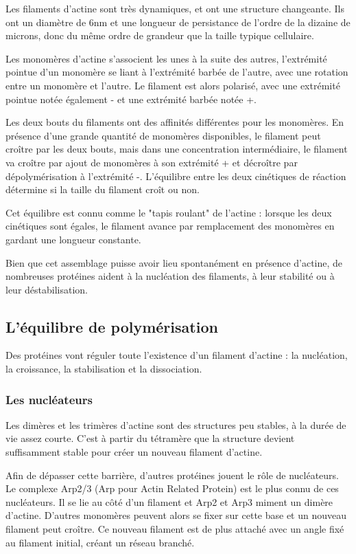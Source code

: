 Les filaments d'actine sont très dynamiques, et ont une structure changeante. Ils ont un diamètre de 6nm et une longueur de persistance de l'ordre de la dizaine de microns, donc du même ordre de grandeur que la taille typique cellulaire. 

Les monomères d'actine s'associent les unes à la suite des autres, l'extrémité pointue d'un monomère se liant à l'extrémité barbée de l'autre, avec une rotation entre un monomère et l'autre. 
Le filament est alors polarisé, avec une extrémité pointue notée également - et une extrémité barbée notée +. 

Les deux bouts du filaments ont des affinités différentes pour les monomères. En présence d'une grande quantité de monomères disponibles, le filament peut croître par les deux bouts, mais dans une concentration intermédiaire, le filament va croître par ajout de monomères à son extrémité + et décroître par dépolymérisation à l'extrémité -. L'équilibre entre les deux cinétiques de réaction détermine si la taille du filament croît ou non. 

Cet équilibre est connu comme le "tapis roulant" de l'actine : lorsque les deux cinétiques sont égales, le filament avance par remplacement des monomères en gardant une longueur constante. 

Bien que cet assemblage puisse avoir lieu spontanément en présence d'actine, de nombreuses protéines aident à la nucléation des filaments, à leur stabilité ou à leur déstabilisation. 

\subsection{L'équilibre de polymérisation}

Des protéines vont réguler toute l'existence d'un filament d'actine : la nucléation, la croissance, la stabilisation et la dissociation. 

\subsubsection{Les nucléateurs}
Les dimères et les trimères d'actine sont des structures peu stables, à la durée de vie assez courte. C'est à partir du tétramère que la structure devient suffisamment stable pour créer un nouveau filament d'actine. 

Afin de dépasser cette barrière, d'autres protéines jouent le rôle de nucléateurs. Le complexe Arp2/3 (Arp pour Actin Related Protein) est le plus connu de ces nucléateurs. Il se lie au côté d'un filament et Arp2 et Arp3 miment un dimère d'actine. D'autres monomères peuvent alors se fixer sur cette base et un nouveau filament peut croître. Ce nouveau filament est de plus attaché avec un angle fixé au filament initial, créant un réseau branché. 


